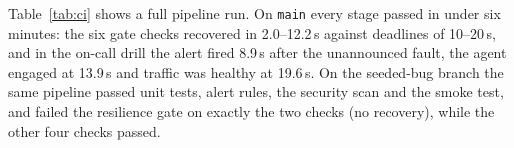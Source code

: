 \begin{table}[t]
\caption{Jenkins stage durations for \texttt{main} and for the branch with the seeded bug ($\times$:
the failing stage; later stages do not run). The last stage includes teardown.}
\label{tab:ci}
\centering
\small

\end{table}

Table~\ref{tab:ci} shows a full pipeline run. On \texttt{main} every stage passed in under six
minutes: the six gate checks recovered in 2.0--12.2\,s against deadlines of 10--20\,s, and in the
on-call drill the alert fired 8.9\,s after the unannounced fault, the agent engaged at 13.9\,s and
traffic was healthy at 19.6\,s. On the seeded-bug branch the same pipeline passed unit tests, alert
rules, the security scan and the smoke test, and failed the resilience gate on exactly the two
 checks (no recovery), while the other four checks passed.
